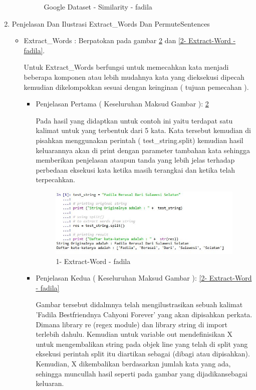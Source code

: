\begin{enumerate}
\begin{enumerate}
\begin{figure}[!hbtp]
\caption{Google Dataset - Similarity - fadila}
\label{Google Dataset - Similarity - fadila}
\end{figure}
\par
\end{enumerate}
\par
\par
\par
\par
\item Penjelasan Dan Ilustrasi Extract\_Words Dan PermuteSentences
\begin{itemize}
\item Extract\_Words :  Berpatokan pada gambar \ref{1- Extract-Word - fadila} dan  \ref{2- Extract-Word - fadila}.
\par Untuk Extract\_Words berfungsi untuk memecahkan kata menjadi beberapa komponen atau lebih mudahnya kata yang dieksekusi dipecah kemudian dikelompokkan sesuai dengan keinginan ( tujuan pemecahan ).
\begin{itemize}
\item Penjelasan Pertama ( Keseluruhan Maksud Gambar ): \ref{1- Extract-Word - fadila}
\par Pada hasil yang didaptkan untuk contoh ini yaitu terdapat satu kalimat untuk yang terbentuk dari 5 kata. Kata tersebut kemudian di pisahkan menggunakan perintah ( test\_string.split) kemudian hasil keluarannya akan di print dengan parameter tambahan kata sehingga memberikan penjelasan ataupun tanda yang lebih jelas terhadap perbedaan eksekusi kata ketika masih terangkai dan ketika telah terpecahkan.
\par
\begin{figure}[!hbtp]
\centering
\includegraphics[scale=0.3]{figures/extract-word-fadila.jpg}
\caption{1- Extract-Word - fadila}
\label{1- Extract-Word - fadila}
\end{figure}
\par
\item Penjelasan Kedua ( Keseluruhan Maksud Gambar ): \ref{2- Extract-Word - fadila}
\par  Gambar tersebut didalmnya telah mengilustrasikan sebuah kalimat 'Fadila Bestfriendnya Cahyoni Forever' yang  akan dipisahkan perkata. Dimana library re (regex module) dan library string di import terlebih dahulu. Kemudian untuk variable out mendefinisikan X untuk mengembalikan string pada objek line yang telah di split yang eksekusi perintah split itu diartikan sebagai (dibagi atau dipisahkan). Kemudian, X dikembalikan berdasarkan jumlah kata yang ada, sehingga muncullah hasil seperti pada gambar yang dijadikansebagai keluaran.

\end{itemize}
\end{itemize}
\end{enumerate}

